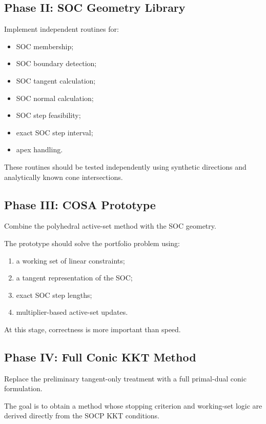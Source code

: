 \documentclass[11pt,a4paper]{article}
\begin{document}
\subsection{Phase II: SOC Geometry Library}

Implement independent routines for:

\begin{itemize}
    \item SOC membership;
    \item SOC boundary detection;
    \item SOC tangent calculation;
    \item SOC normal calculation;
    \item SOC step feasibility;
    \item exact SOC step interval;
    \item apex handling.
\end{itemize}

These routines should be tested independently using synthetic
directions and analytically known cone intersections.

\subsection{Phase III: COSA Prototype}

Combine the polyhedral active-set method with the SOC geometry.

The prototype should solve the portfolio problem using:

\begin{enumerate}
    \item a working set of linear constraints;
    \item a tangent representation of the SOC;
    \item exact SOC step lengths;
    \item multiplier-based active-set updates.
\end{enumerate}

At this stage, correctness is more important than speed.

\subsection{Phase IV: Full Conic KKT Method}

Replace the preliminary tangent-only treatment with a full
primal-dual conic formulation.

The goal is to obtain a method whose stopping criterion and
working-set logic are derived directly from the SOCP KKT conditions.
\end{document}

